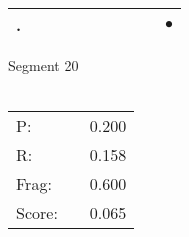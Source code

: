 \documentclass[landscape]{article}
\newcommand{\ssp}{\hspace{2pt}}
\newcommand{\mex}{\cellcolor{g}$\bullet$}
\begin{document}
\begin{tabular}{|l|p{10pt}|p{10pt}|p{10pt}|p{10pt}|p{10pt}|p{10pt}|p{10pt}|p{10pt}|p{10pt}|}
\hline
\ssp \cellcolor{ref8}. \ssp&\hspace{2pt}&\hspace{2pt}&\hspace{2pt}&\hspace{2pt}&\hspace{2pt}&\hspace{2pt}&\hspace{2pt}&\hspace{2pt}&\hspace{2pt}\mex\\
\hline
\end{tabular}

\vspace{6pt}
\noindent Segment 20\\\\
\noindent\begin{tabular}{lm{12pt}r}
\hline
P:&&0.200\\
R:&&0.158\\
Frag:&&0.600\\
Score:&&0.065\\
\end{tabular}

\newpage
\end{document}
